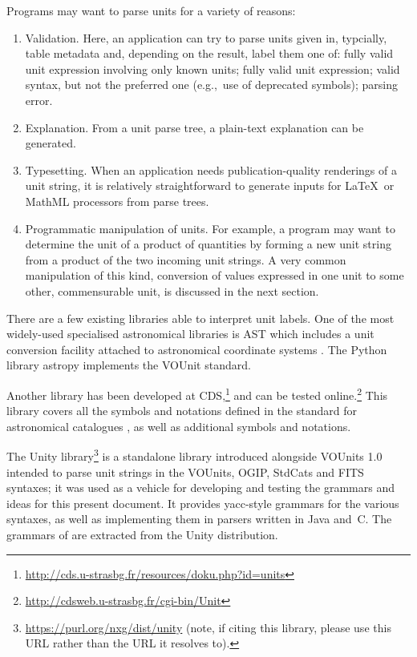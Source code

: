 \documentclass[11pt,a4paper]{ivoa}
\def\eg{e.g.,~}
\begin{document}
Programs may want to parse units for a variety of reasons:
\begin{enumerate}
\item Validation.  Here, an application can try to parse units given in,
typcially, table metadata and, depending on the result, label them one of:
fully valid unit expression involving only known units;
fully valid unit expression; valid syntax, but
not the preferred one (\eg  use of deprecated symbols); parsing error.
\item Explanation. From a unit parse tree, a plain-text explanation can
be generated.
\item Typesetting. When an application needs publication-quality
renderings of a unit string, it is relatively straightforward to
generate inputs for \LaTeX\ or MathML processors from parse trees.
\item Programmatic manipulation of units.  For example, a program may
want to determine the unit of a product of quantities by forming a new
unit string from a product of the two incoming unit strings.  A very
common manipulation of this kind, conversion of values expressed in one
unit to some other, commensurable unit, is discussed in the next
section.
\end{enumerate}

There are a few existing libraries able to interpret unit labels.
One of the most widely-used specialised
astronomical libraries is AST which includes a unit conversion
facility attached to astronomical coordinate systems \citep{berry12}.
The Python library astropy \citep{2013A+A...558A..33A} implements the
VOUnit standard.

Another library has been developed at
CDS,\footnote{\url{http://cds.u-strasbg.fr/resources/doku.php?id=units}}
and can be tested online.\footnote{\url{http://cdsweb.u-strasbg.fr/cgi-bin/Unit}} This library covers all
the symbols and notations defined in the standard for astronomical catalogues \citep[\S3.2]{cds00}, as well as
additional symbols and notations.

The Unity library\footnote{\url{https://purl.org/nxg/dist/unity}
(note, if citing this library, please use this URL rather than the URL
it resolves to).} is a
standalone library introduced alongside VOUnits 1.0
intended to parse unit strings in the VOUnits,
OGIP, StdCats and FITS syntaxes; it was used as a vehicle for
developing and testing the grammars and
ideas for this present document.  It provides yacc-style grammars for
the various syntaxes, as well as implementing them in parsers written
in Java and~C.  The grammars of  are extracted
from the Unity distribution.
\end{document}
